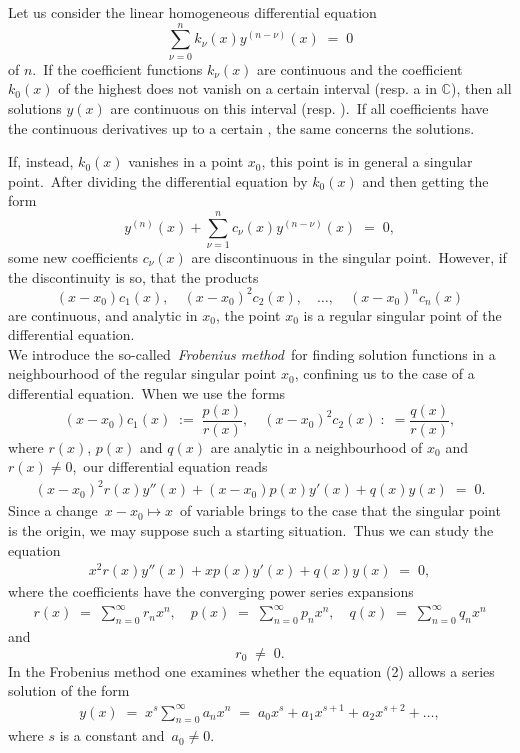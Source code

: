 \documentclass[12pt]{article}
\theoremstyle{definition}
\begin{document}
Let us consider the linear homogeneous differential equation
$$\sum_{\nu=0}^n k_\nu(x) y^{(n-\nu)}(x) \;=\; 0$$
of  $n$.\, If the coefficient functions $k_\nu(x)$ are continuous and the coefficient $k_0(x)$ of the highest  does not vanish on a certain interval (resp. a  in $\mathbb{C}$), then all solutions $y(x)$ are continuous on this interval (resp. ).\, If all coefficients have the continuous derivatives up to a certain , the same concerns the solutions.

If, instead, $k_0(x)$ vanishes in a point $x_0$, this point is in general a singular point.\, After dividing the differential equation by $k_0(x)$ and then getting the form
$$y^{(n)}(x)+\sum_{\nu=1}^n c_\nu(x)y^{(n-\nu)}(x) \;=\; 0,$$
some new coefficients $c_\nu(x)$ are discontinuous in the singular point.\, However, if the discontinuity is  so, that the products
$$(x-x_0)c_1(x),\quad (x-x_0)^2c_2(x),\quad \ldots,\quad (x-x_0)^nc_n(x)$$
are continuous, and  analytic in $x_0$, the point $x_0$ is a regular singular point of the differential equation.\\

We introduce the so-called\, {\em Frobenius method}\, for finding solution functions in a neighbourhood of the regular singular point $x_0$, confining us to the case of a  differential equation.\, When we use the  forms
$$(x-x_0)c_1(x) \;:=\; \frac{p(x)}{r(x)},\quad (x-x_0)^2c_2(x) \;:\;= \frac{q(x)}{r(x)},$$
where $r(x)$, $p(x)$ and $q(x)$ are analytic in a neighbourhood of $x_0$ and\, $r(x) \neq 0$,\, our differential equation reads
\begin{align}
(x-x_0)^2r(x)y''(x)+(x-x_0)p(x)y'(x)+q(x)y(x) \;=\; 0.
\end{align}
Since a  change\, $x\!-\!x_0\mapsto x$\, of variable brings to the case that the singular point is the origin, we may suppose such a starting situation.\, Thus we can study the equation
\begin{align}
x^2r(x)y''(x)+xp(x)y'(x)+q(x)y(x) \;=\; 0,
\end{align}
where the coefficients have the converging power series expansions
\begin{align}
r(x) \;=\; \sum_{n=0}^\infty r_nx^n,\quad p(x) \;=\; \sum_{n=0}^\infty p_nx^n,\quad q(x) \;=\; \sum_{n=0}^\infty q_nx^n
\end{align}
and
$$r_0 \;\neq\; 0.$$
In the Frobenius method one examines whether the equation (2) allows a series solution of the form
\begin{align}
y(x) \;=\; x^s\sum_{n=0}^\infty a_nx^n \;=\; a_0x^s+a_1x^{s+1}+a_2x^{s+2}+\ldots,
\end{align}
where $s$ is a constant and\, $a_0 \neq 0$.
\end{document}
